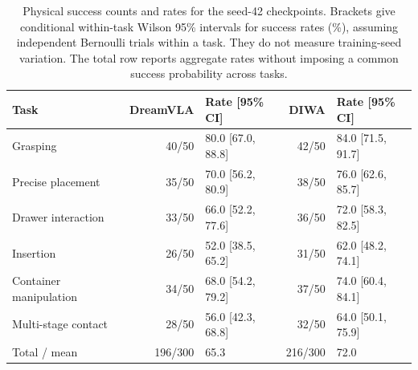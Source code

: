 \begin{table}[htbp]
\centering
\caption{Physical success counts and rates for the seed-42 checkpoints. Brackets give conditional within-task Wilson 95\% intervals for success rates (\%), assuming independent Bernoulli trials within a task. They do not measure training-seed variation. The total row reports aggregate rates without imposing a common success probability across tasks.}
\label{tab:real_robot}
\small
\begin{tabular}{lrlrl}
\toprule
Task & DreamVLA & Rate [95\% CI] & DIWA & Rate [95\% CI]\\
\midrule
Grasping & 40/50 & 80.0 [67.0, 88.8] & 42/50 & 84.0 [71.5, 91.7]\\
Precise placement & 35/50 & 70.0 [56.2, 80.9] & 38/50 & 76.0 [62.6, 85.7]\\
Drawer interaction & 33/50 & 66.0 [52.2, 77.6] & 36/50 & 72.0 [58.3, 82.5]\\
Insertion & 26/50 & 52.0 [38.5, 65.2] & 31/50 & 62.0 [48.2, 74.1]\\
Container manipulation & 34/50 & 68.0 [54.2, 79.2] & 37/50 & 74.0 [60.4, 84.1]\\
Multi-stage contact & 28/50 & 56.0 [42.3, 68.8] & 32/50 & 64.0 [50.1, 75.9]\\
\midrule
Total / mean & 196/300 & 65.3 & 216/300 & 72.0\\
\bottomrule
\end{tabular}
\end{table}
